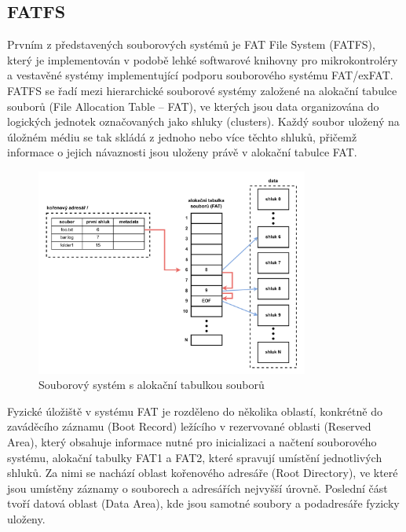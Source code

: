 \subsection{FATFS}
\label{fatfs}
Prvním z představených souborových systémů je FAT File System (FATFS), který je implementován v podobě lehké softwarové knihovny pro mikrokontroléry a vestavěné systémy implementující podporu souborového systému FAT/exFAT. FATFS se řadí mezi hierarchické souborové systémy založené na alokační tabulce souborů (File Allocation Table – FAT), ve kterých jsou data organizována do logických jednotek označovaných jako shluky (clusters). Každý soubor uložený na úložném médiu se tak skládá z jednoho nebo více těchto shluků, přičemž informace o jejich návaznosti jsou uloženy právě v alokační tabulce FAT. \cite{recoverit_fat_filesystem, elm_fat_filesystem_docs}

\begin{figure}[h]
    \centering
    \includegraphics[width=0.80\textwidth]{obrazky-figures/fat_file_system-cz.pdf}
    
    \caption{Souborový systém s alokační tabulkou souborů \cite{recoverit_fat_filesystem}}
    \label{fig:fat-file-system-structure}
\end{figure}

Fyzické úložiště v systému FAT je rozděleno do několika oblastí, konkrétně do zaváděcího záznamu (Boot Record) ležícího v rezervované oblasti (Reserved Area), který obsahuje informace nutné pro inicializaci a načtení souborového systému, alokační tabulky FAT1 a FAT2, které spravují umístění jednotlivých shluků. Za nimi se nachází oblast kořenového adresáře (Root Directory), ve které jsou umístěny záznamy o souborech a adresářích nejvyšší úrovně. Poslední část tvoří datová oblast (Data Area), kde jsou samotné soubory a podadresáře fyzicky uloženy.

